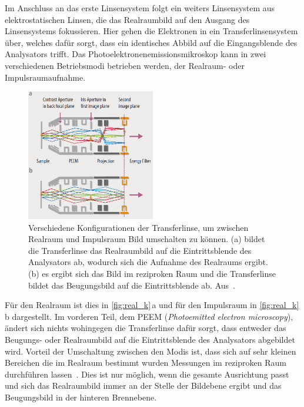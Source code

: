         Im Anschluss an das erste Linsensystem folgt ein weiters Linsensystem aus elektrostatischen Linsen, die das Realraumbild auf den Ausgang des Linsensystems fokussieren.
        Hier gehen die Elektronen in ein Transferlinsensystem über, welches dafür sorgt, dass ein identisches Abbild auf die Eingangsblende des Analysators trifft.
        Das Photoelektronenemissionsmikroskop kann in zwei verschiedenen Betriebsmodi betrieben werden, der Realraum- oder Impulsraumaufnahme.
        \begin{figure}
            \centering
            \includegraphics[width=0.5\textwidth]{Real_k.PNG}
            \caption{Verschiedene Konfigurationen der Transferlinse, um zwischen Realraum und Impulsraum Bild umschalten zu können.
            (a) bildet die Transferlinse das Realraumbild auf die Eintrittsblende des Analysators ab, wodurch sich die Aufnahme des Realraums ergibt.
            (b) es ergibt sich das Bild im reziproken Raum und die Transferlinse bildet das Beugungsbild auf die Eintrittsblende ab.
            Aus~\cite{Focus}.}
            \label{fig:real_k}
        \end{figure}
        Für den Realraum ist dies in \autoref{fig:real_k}\,a und für den Impulsraum in \autoref{fig:real_k}\,b dargestellt.
        Im vorderen Teil, dem PEEM (\textit{Photoemitted electron microscopy}), ändert sich nichts wohingegen die Transferlinse dafür sorgt, dass entweder das Beugungs- oder Realraumbild auf die Eintrittsblende des Analysators abgebildet wird.
        Vorteil der Umschaltung zwischen den Modis ist, dass sich auf sehr kleinen Bereichen die im Realraum bestimmt wurden Messungen im reziproken Raum durchführen lassen~\cite{suga_photoelectron_2021}.
        Dies ist nur möglich, wenn die gesamte Ausrichtung passt und sich das Realraumbild immer an der Stelle der Bildebene ergibt und das Beugungsbild in der hinteren Brennebene.

